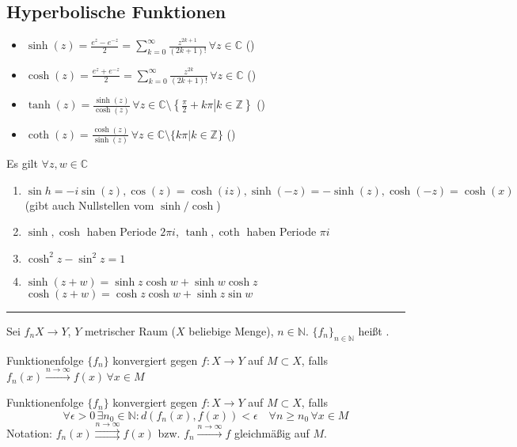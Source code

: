 \subsection*{Hyperbolische Funktionen}
\begin{*definition}
	\begin{itemize}
		\item $\sinh (z) = \frac{e^z - e^{-z}}{2} = \sum_{k=0}^\infty \frac{z^{2k+1}}{(2k+1)!}\,\forall z\in\mathbb{C}$ ()
		\item $\cosh (z) = \frac{e^z+e^{-z}}{2} = \sum_{k=0}^\infty \frac{z^{2k}}{(2k+1)!}\,\forall z\in\mathbb{C}$ ()
		\item $\tanh (z) = \frac{\sinh (z)}{\cosh (z)}\,\forall z\in\mathbb{C}\setminus\left\lbrace \left.\frac{\pi}{2} + k\pi  \right| k\in\mathbb{Z} \right\rbrace$ ()
		\item $\coth(z) = \frac{\cosh(z)}{\sinh(z)} \,\forall z\in\mathbb{C}\setminus \{ k\pi | k\in\mathbb{Z}\}$ ()
	\end{itemize}
\end{*definition}

\begin{proposition}
	Es gilt $\forall z,w\in\mathbb{C}$
	\begin{enumerate}[label={\arabic*)}]
		\item $\sin h = -i\sin(z), \cos (z) = \cosh(iz), \sinh(-z) = -\sinh(z), \cosh(-z) = \cosh(x)$ (gibt auch Nullstellen vom $\sinh / \cosh$)
		\item $\sinh, \cosh$ haben Periode $2\pi i$, $\tanh, \coth$ haben Periode $\pi i$
		\item $\cosh^2 z - \sin^2 z = 1$
		\item $\sinh(z+w) = \sinh z \cosh w + \sinh w \cosh z$\\
		$\cosh (z+w) = \cosh z \cosh w + \sinh z \sin w$
	\end{enumerate}
\end{proposition}
\rule{4cm}{0.4pt}
\begin{*definition}
	Sei $f_n X\to Y$, $Y$ metrischer Raum ($X$ beliebige Menge), $n\in\mathbb{N}$. $\{f_n\}_{n\in\mathbb{N}}$ heißt .
	
	Funktionenfolge $\{f_n\}$ konvergiert  gegen $f:X\to Y$ auf $M\subset X$, falls $f_n(x) \overset{n\rightarrow\infty}{\longrightarrow} f(x) \,\forall x\in M$
	
	Funktionenfolge $\{f_n\}$ konvergiert  gegen $f:X\to Y$ auf $M\subset X$, falls \[ \forall \epsilon > 0 \,\exists n_0\in\mathbb{N}: d(f_n(x), f(x)) < \epsilon\quad \forall n\ge n_0\,\forall x\in M \]
	Notation: \mathsymbol*{->}{$\rightrightarrows$} $f_n(x) \overset{n\rightarrow\infty}{\rightrightarrows} f(x)$ bzw. $f_n\overset{n\rightarrow\infty}{\longrightarrow}f$ gleichmäßig auf $M$.
\end{*definition}

